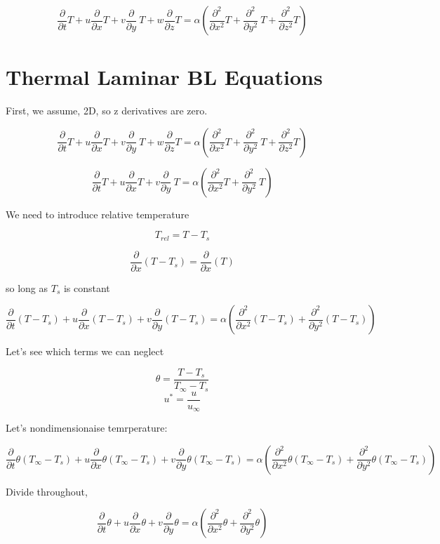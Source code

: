 \documentclass[11pt]{article}
\begin{document}
$$\frac{\partial }{\partial t} T + u \frac{\partial}{\partial x} T + v \frac{\partial }{\partial y} \ T + w \frac{\partial }{\partial z} T  = \alpha ( \frac{\partial^2}{\partial x^2} T +  \frac{\partial^2 }{\partial y^2} \ T +  \frac{\partial^2 }{\partial z^2} T) $$ 

\part{Thermal Laminar BL Equations }

First, we assume, 2D, so z derivatives are zero.

$$\frac{\partial }{\partial t} T + u \frac{\partial}{\partial x} T + v \frac{\partial }{\partial y} \ T + w \frac{\partial }{\partial z} T  = \alpha ( \frac{\partial^2}{\partial x^2} T +  \frac{\partial^2 }{\partial y^2} \ T +  \frac{\partial^2 }{\partial z^2} T) $$ 


$$\frac{\partial }{\partial t} T + u \frac{\partial}{\partial x} T + v \frac{\partial }{\partial y} \ T  = \alpha ( \frac{\partial^2}{\partial x^2} T +  \frac{\partial^2 }{\partial y^2} \ T ) $$ 

We need to introduce relative temperature  

$$T_{rel} = T-T_s$$

$$\frac{\partial}{\partial x} (T-T_s) =\frac{\partial}{\partial x} (T) $$

so long as $T_s$ is constant

$$\frac{\partial }{\partial t} (T-T_s) + u \frac{\partial}{\partial x} (T-T_s) + v \frac{\partial }{\partial y} (T-T_s)  = \alpha ( \frac{\partial^2}{\partial x^2} (T-T_s) +  \frac{\partial^2 }{\partial y^2} (T-T_s) ) $$ 

Let's see which terms we can neglect

$$\theta = \frac{T-T_s}{T_\infty	-T_s}$$
$$u^* = \frac{u}{u_\infty}$$

Let's nondimensionaise temrperature:

$$\frac{\partial }{\partial t} \theta(T_\infty-T_s) + u \frac{\partial}{\partial x} \theta(T_\infty-T_s)  + v \frac{\partial }{\partial y} \theta(T_\infty-T_s)   = \alpha ( \frac{\partial^2}{\partial x^2} \theta(T_\infty-T_s)  +  \frac{\partial^2 }{\partial y^2} \theta(T_\infty-T_s) ) $$ 

Divide throughout,

$$\frac{\partial }{\partial t} \theta + u \frac{\partial}{\partial x} \theta + v \frac{\partial }{\partial y} \theta   = \alpha ( \frac{\partial^2}{\partial x^2} \theta  +  \frac{\partial^2 }{\partial y^2} \theta ) $$ 
\end{document}

